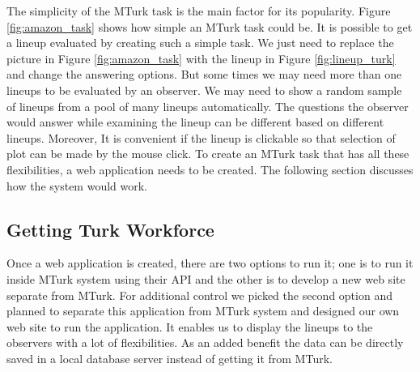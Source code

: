 \documentclass[11pt]{article}
\begin{document}
The simplicity of the MTurk task is the main factor for its popularity. Figure \ref{fig:amazon_task} shows how simple an MTurk task could be. It is possible to get a lineup evaluated by creating such a simple task. We just need to replace the picture in Figure \ref{fig:amazon_task} with the lineup in Figure \ref{fig:lineup_turk} and change the answering options. But some times we may need more than one lineups to be evaluated by an observer. We may need to show a random sample of lineups from a pool of many lineups automatically. The questions the observer would answer while examining the lineup can be different based on different lineups. Moreover, It is convenient if the lineup is clickable so that selection of plot can be made by the mouse click. To create an MTurk task that has all these flexibilities, a web application needs to be created. The following section discusses how the system would work.





\subsection{Getting Turk Workforce}

Once a web application is created, there are two options to run it; one is to run it inside MTurk system using their API and the other is to develop a new web site separate from MTurk. For additional control we picked the second option and planned to separate this application from MTurk system and designed our own web site to run the application. It enables us to display the lineups to the observers with a lot of flexibilities. As an added benefit the data can be directly saved in a local database server instead of getting it from MTurk. 
\end{document}
